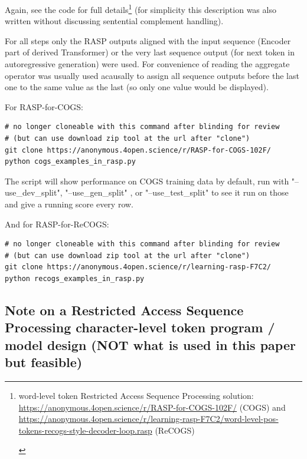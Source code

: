 \documentclass[11pt]{article}
\begin{document}
Again, see the code for full details\footnote{\begin{footnotesize}word-level token Restricted Access Sequence Processing solution: \href{https://anonymous.4open.science/r/RASP-for-COGS-102F/}{https://anonymous.4open.science/r/RASP-for-COGS-102F/} (COGS) and \href{https://anonymous.4open.science/r/learning-rasp-F7C2/word-level-pos-tokens-recogs-style-decoder-loop.rasp}{https://anonymous.4open.science/r/learning-rasp-F7C2/word-level-pos-tokens-recogs-style-decoder-loop.rasp} (ReCOGS) \end{footnotesize}} (for simplicity this description was also written without discussing sentential complement handling).

For all steps only the RASP outputs aligned with the input sequence (Encoder part of derived Transformer) or the very last sequence output (for next token in autoregressive generation) were used. For convenience of reading the aggregate operator was usually used acausally to assign all sequence outputs before the last one to the same value as the last (so only one value would be displayed).

For RASP-for-COGS:
\begin{tiny}
\begin{verbatim}
# no longer cloneable with this command after blinding for review
# (but can use download zip tool at the url after "clone")
git clone https://anonymous.4open.science/r/RASP-for-COGS-102F/
python cogs_examples_in_rasp.py
\end{verbatim}
\end{tiny}

The script will show performance on COGS training data by default, run with "--use\_dev\_split", "--use\_gen\_split" , or "--use\_test\_split" to see it run on those and give a running score every row.

And for RASP-for-ReCOGS:
\begin{tiny}
\begin{verbatim}
# no longer cloneable with this command after blinding for review
# (but can use download zip tool at the url after "clone")
git clone https://anonymous.4open.science/r/learning-rasp-F7C2/
python recogs_examples_in_rasp.py 
\end{verbatim}
\end{tiny}

\clearpage


\subsection{Note on a Restricted Access Sequence Processing character-level token program / model design (NOT what is used in this paper but feasible)}
\label{rasp_character_level_model_notes}
\end{document}
